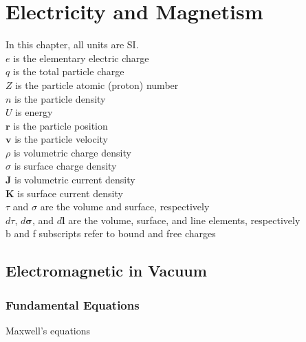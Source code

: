 \chapter{Electricity and Magnetism}
In this chapter, all units are SI.\\

\noindent
$e$ is the elementary electric charge\\
$q$ is the total particle charge\\
$Z$ is the particle atomic (proton) number\\
$n$ is the particle density\\
$U$ is energy\\
$\mathbf{r}$ is the particle position\\
$\mathbf{v}$ is the particle velocity\\
$\rho$ is volumetric charge density\\
$\sigma$ is surface charge density\\
$\textbf{J}$ is volumetric current density\\
$\textbf{K}$ is surface current density\\
$\tau$ and $\sigma$ are the volume and surface, respectively\\
$d\tau$, $d\boldsymbol{\sigma}$, and $d\textbf{l}$ are the volume, surface, and line elements, respectively\\
b and f subscripts refer to bound and free charges

\section{Electromagnetic in Vacuum}


\subsection{Fundamental Equations}
Maxwell's equations 

